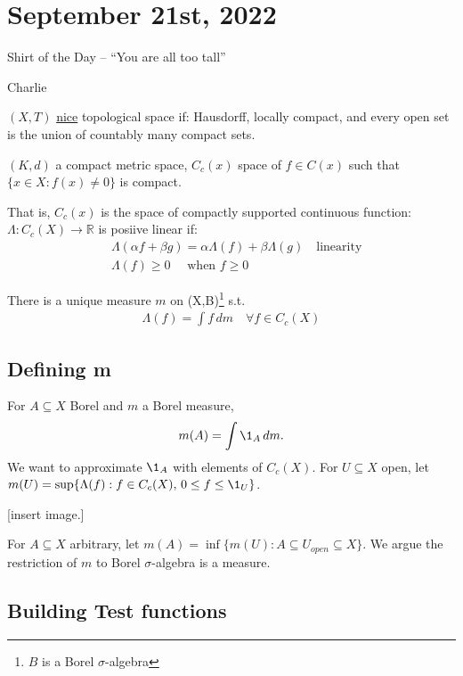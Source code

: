\section{September 21st, 2022}

\epigraph{Shirt of the Day -- ``You are all too tall''}{Charlie}

\begin{definition}
	$(X,T)$ \underline{nice} topological space if: Hausdorff, locally compact, and every open set is the union of countably many compact sets.
\end{definition}

\begin{example}
	$(K,d)$ a compact metric space, $C_c (x)$ space of $f \in C(x)$ such that $\{x\in X: f(x) \neq 0 \}$ is compact.

	That is, $C_c (x)$ is the space of compactly supported continuous function:
		$\Lambda : C_c(X) \to \mathbb{R}$ is posiive linear if:
	\begin{align*}
		&\Lambda(\alpha f + \beta g) = \alpha \Lambda(f) + \beta \Lambda(g) \quad \text{linearity} \\
		&\Lambda(f) \geq 0 \quad \text{ when } f \geq 0
	\end{align*}
\end{example}

\begin{theorem}
	There is a unique measure $m$ on (X,B)\footnote{$B$ is a Borel $\sigma$-algebra} s.t.
	\begin{align*}
		\Lambda(f) = \int f \, dm \quad \forall f \in C_c (X)
	\end{align*}
\end{theorem}

\subsection{Defining m}
For $A \subseteq X$ Borel and $m$ a Borel measure,
	\[
		m(A) = \int \1_{A} \, dm.
	\]
We want to approximate $\1_A$ with elements of $C_c (X)$.
For $U \subseteq X $ open, let $m(U) = \sup\{\Lambda (f) : f \in C_c (X), \, 0 \leq f \leq \1_{U} \}$.

[insert image.]

For $A \subseteq X$ arbitrary, let $m(A) = \inf\{m(U) : A \subseteq U_{open} \subseteq X\}$.
We argue the restriction of $m$ to Borel $\sigma$-algebra is a measure.

\subsection{Building Test functions}

